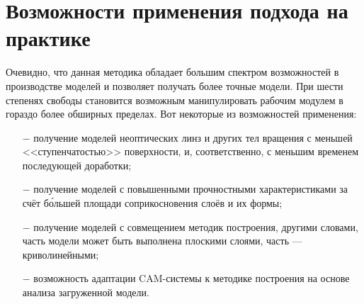 \section {Возможности применения подхода на практике}

Очевидно, что данная методика обладает большим спектром возможностей в производстве моделей и позволяет получать более точные модели. При шести степенях свободы становится возможным манипулировать рабочим модулем в гораздо более обширных пределах. Вот некоторые из возможностей применения:

\begin{itemize}
\item[$-$] получение моделей неоптических линз и других тел вращения с меньшей <<ступенчатостью>> поверхности, и, соответственно, с меньшим временем последующей доработки;
\item[$-$] получение моделей с повышенными прочностными характеристиками за счёт б\'ольшей площади соприкосновения слоёв и их формы;
\item[$-$] получение моделей с совмещением методик построения, другими словами, часть модели может быть выполнена плоскими слоями, часть — криволинейными;
\item[$-$] возможность адаптации CAM-системы к методике построения на основе анализа загруженной модели.
\end{itemize} 
